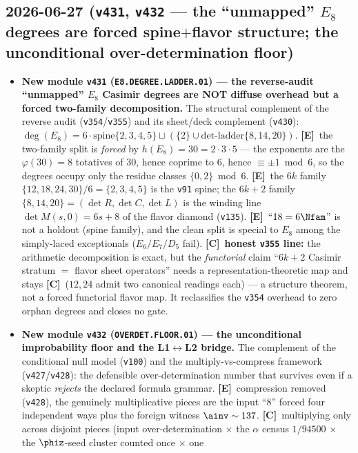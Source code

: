 \documentclass[11pt]{article}
\providecommand{\mE}{\textbf{[E]}}\providecommand{\mC}{\textbf{[C]}}
\providecommand{\vref}[1]{\texttt{#1}}
\begin{document}
\subsection*{2026-06-27 (\texttt{v431}, \texttt{v432} --- the ``unmapped'' $E_8$ degrees are forced spine$+$flavor structure; the unconditional over-determination floor)}
\begin{itemize}
\item \textbf{New module \texttt{v431} (\texttt{E8.DEGREE.LADDER.01}) --- the reverse-audit ``unmapped'' $E_8$
Casimir degrees are NOT diffuse overhead but a forced two-family decomposition.} The structural
complement of the reverse audit (\vref{v354}/\vref{v355}) and its sheet/deck complement (\vref{v430}):
$\deg(E_8)=6\cdot\mathrm{spine}\{2,3,4,5\}\sqcup(\{2\}\cup\mathrm{det\text{-}ladder}\{8,14,20\})$.
\mE\ the two-family split is \emph{forced} by $h(E_8)=30=2\cdot3\cdot5$ --- the exponents are the
$\varphi(30)=8$ totatives of $30$, hence coprime to $6$, hence $\equiv\pm1\bmod6$, so the degrees occupy
only the residue classes $\{0,2\}\bmod6$. \mE\ the $6k$ family $\{12,18,24,30\}/6=\{2,3,4,5\}$ is the
\vref{v91} spine; the $6k{+}2$ family $\{8,14,20\}=(\det R,\det C,\det L)$ is the winding line
$\det M(s,0)=6s+8$ of the flavor diamond (\vref{v135}). \mE\ ``$18=6\Nfam$'' is not a holdout (spine
family), and the clean split is special to $E_8$ among the simply-laced exceptionals ($E_6/E_7/D_5$ fail).
\mC\ \textbf{honest \vref{v355} line:} the arithmetic decomposition is exact, but the \emph{functorial}
claim ``$6k{+}2$ Casimir stratum $=$ flavor sheet operators'' needs a representation-theoretic map and
stays \mC\ ($12,24$ admit two canonical readings each) --- a structure theorem, not a forced functorial
flavor map. It reclassifies the \vref{v354} overhead to zero orphan degrees and closes no gate.
\item \textbf{New module \texttt{v432} (\texttt{OVERDET.FLOOR.01}) --- the unconditional improbability
floor and the L1$\leftrightarrow$L2 bridge.} The complement of the conditional null model (\vref{v100})
and the multiply-vs-compress framework (\vref{v427}/\vref{v428}): the defensible over-determination number
that survives even if a skeptic \emph{rejects} the declared formula grammar. \mE\ compression removed
(\vref{v428}), the genuinely multiplicative pieces are the input ``$8$'' forced four independent ways plus
the foreign witness $\ainv\sim137$. \mC\ multiplying only across disjoint pieces (input over-determination
$\times$ the $\alpha$ census $1/94500$ $\times$ the $\phiz$-seed cluster counted once $\times$ one

\end{itemize}
\end{document}
